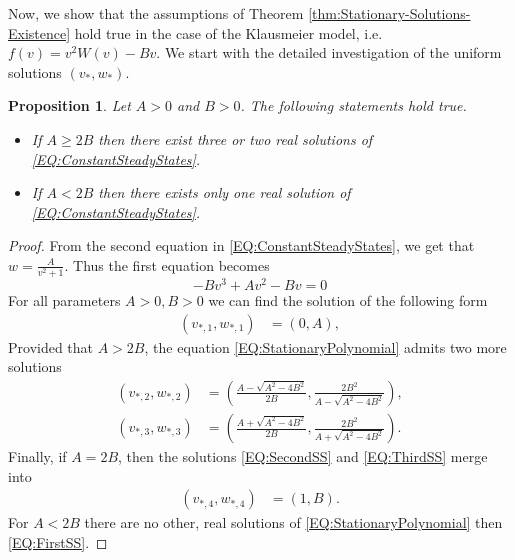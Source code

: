 \documentclass[11pt, a4paper]{article}
\theoremstyle{break}
\theoremstyle{break}
\newtheorem{prp}{Proposition}[section]
\theoremstyle{break}
\theoremstyle{break}
\theoremstyle{break}
\theoremstyle{break}
\theoremstyle{break}
\theoremstyle{break}
\theoremstyle{break}
\begin{document}
Now, we show that the assumptions of  Theorem \ref{thm:Stationary-Solutions-Existence} hold true in the case of the Klausmeier model, i.e. $f(v) = v^2W(v) - Bv$. We start with the detailed investigation of the uniform solutions $(v_*, w_*)$.

\begin{prp}
    \label{prp:ExistenceOfConstantSSKineticSystem}
    Let $A > 0$ and $B > 0$. The following statements hold true.
    \begin{itemize}
        \item If $A \geq 2B$ then there exist three or two real solutions of \eqref{EQ:ConstantSteadyStates}.
        \item If $A < 2B$ then there exists only one real solution of \eqref{EQ:ConstantSteadyStates}.
    \end{itemize}
\end{prp}

\begin{proof}
    From the second equation in \eqref{EQ:ConstantSteadyStates}, we get that $w = \frac{A}{v^2 + 1}$. Thus the first equation becomes
    \begin{equation}
        \label{EQ:StationaryPolynomial}
        -B v^3 + A v^2 - B v = 0
    \end{equation}
    For all parameters $A > 0, B > 0$ we can find the solution of the following form
    \begin{align}
        \label{EQ:FirstSS}
        \left(v_{*,1}, w_{*,1}\right) &= \left(0, A\right),
    \end{align}
    Provided that $A > 2B$, the equation \eqref{EQ:StationaryPolynomial} admits two more solutions
    \begin{align}
        \left(v_{*,2}, w_{*,2}\right) &= \left(\frac{A - \sqrt{A^2 - 4B^2}}{2B}, \frac{2 B^2}{A - \sqrt{A^2 - 4B^2}}\right), \label{EQ:SecondSS}\\
        \left(v_{*,3}, w_{*,3}\right) &= \left(\frac{A + \sqrt{A^2 - 4B^2}}{2B}, \frac{2 B^2}{A + \sqrt{A^2 - 4B^2}}\right) \label{EQ:ThirdSS}.
    \end{align}
    Finally, if $A = 2B$, then the solutions \eqref{EQ:SecondSS} and \eqref{EQ:ThirdSS} merge into 
    \begin{align}
        \label{EQ:FourthSS}
        \left( v_{*,4}, w_{*,4} \right) &= \left(1, B\right).
    \end{align}
    For $A < 2B$ there are no other, real solutions of \eqref{EQ:StationaryPolynomial} then \eqref{EQ:FirstSS}.
\end{proof}
\end{document}
